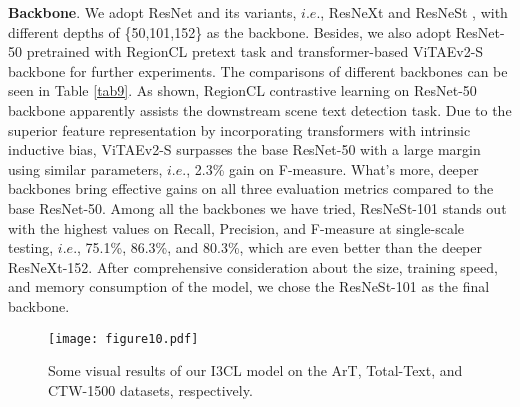 \textbf{Backbone}. We adopt ResNet \citep{resnet} and its variants, $i.e.$, ResNeXt \citep{resnext} and ResNeSt \citep{resnest}, with different depths of \{50,101,152\} as the backbone. Besides, we also adopt ResNet-50 pretrained with RegionCL \citep{regioncl} pretext task and transformer-based ViTAEv2-S \citep{zhang2022vitaev2} backbone for further experiments. The comparisons of different backbones can be seen in Table \ref{tab9}. As shown, RegionCL contrastive learning on ResNet-50 backbone apparently assists the downstream scene text detection task. Due to the superior feature representation by incorporating transformers with intrinsic inductive bias, ViTAEv2-S surpasses the base ResNet-50 with a large margin using similar parameters, $i.e.$, 2.3\% gain on F-measure. What's more, deeper backbones bring effective gains on all three evaluation metrics compared to the base ResNet-50. Among all the backbones we have tried, ResNeSt-101 stands out with the highest values on Recall, Precision, and F-measure at single-scale testing, $i.e.$, 75.1\%, 86.3\%, and 80.3\%, which are even better than the deeper ResNeXt-152. After comprehensive consideration about the size, training speed, and memory consumption of the model, we chose the ResNeSt-101 as the final backbone.

\begin{figure*}[ht]
  \centering
  \texttt{[image: figure10.pdf]}
  \caption{Some visual results of our I3CL model on the ArT, Total-Text, and CTW-1500 datasets, respectively.}
  \label{fig10}
\end{figure*}



